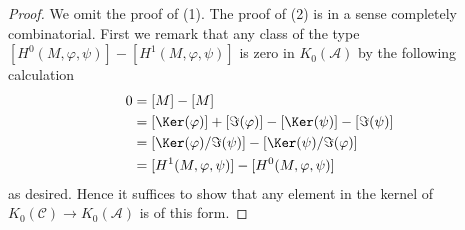 \begin{proof}
We omit the proof of (1). The proof of (2) is in a sense completely
combinatorial. First we remark that any class of the type
$[H^0(M, \varphi, \psi)] - [H^1(M, \varphi, \psi)]$ is zero
in $K_0(\mathcal{A})$ by the following calculation
\begin{align*}
0 & = [M] - [M] \\
& =  [\Ker(\varphi)] + [\Im(\varphi)]
- [\Ker(\psi)] - [\Im(\psi)] \\
& =
[\Ker(\varphi)/\Im(\psi)] -
[\Ker(\psi)/\Im(\varphi)] \\
& = [H^1(M, \varphi, \psi)] - [H^0(M, \varphi, \psi)]
\end{align*}
as desired. Hence it suffices to show that any element in the kernel
of $K_0(\mathcal{C}) \to K_0(\mathcal{A})$ is of this form.


\end{proof}

